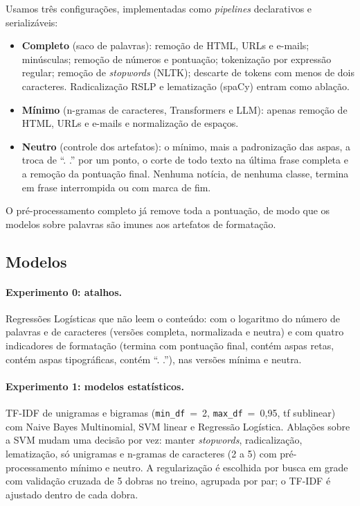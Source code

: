 Usamos três configurações, implementadas como \emph{pipelines} declarativos e serializáveis:
\begin{itemize}
\item \textbf{Completo} (saco de palavras): remoção de HTML, URLs e e-mails; minúsculas; remoção de números e pontuação; tokenização por expressão regular; remoção de \emph{stopwords} (NLTK); descarte de tokens com menos de dois caracteres. Radicalização RSLP \citep{orengo2001} e lematização (spaCy) entram como ablação.
\item \textbf{Mínimo} (n-gramas de caracteres, Transformers e LLM): apenas remoção de HTML, URLs e e-mails e normalização de espaços.
\item \textbf{Neutro} (controle dos artefatos): o mínimo, mais a padronização das aspas, a troca de ``. .'' por um ponto, o corte de todo texto na última frase completa e a remoção da pontuação final. Nenhuma notícia, de nenhuma classe, termina em frase interrompida ou com marca de fim.
\end{itemize}
O pré-processamento completo já remove toda a pontuação, de modo que os modelos sobre palavras são imunes aos artefatos de formatação.

\subsection{Modelos}

\paragraph{Experimento 0: atalhos.} Regressões Logísticas que não leem o conteúdo: com o logaritmo do número de palavras e de caracteres (versões completa, normalizada e neutra) e com quatro indicadores de formatação (termina com pontuação final, contém aspas retas, contém aspas tipográficas, contém ``. .''), nas versões mínima e neutra.

\paragraph{Experimento 1: modelos estatísticos.} TF-IDF de unigramas e bigramas (\texttt{min\_df}~=~2, \texttt{max\_df}~=~0,95, tf sublinear) com Naive Bayes Multinomial, SVM linear e Regressão Logística. Ablações sobre a SVM mudam uma decisão por vez: manter \emph{stopwords}, radicalização, lematização, só unigramas e n-gramas de caracteres (2 a 5) com pré-processamento mínimo e neutro. A regularização é escolhida por busca em grade com validação cruzada de 5 dobras no treino, agrupada por par; o TF-IDF é ajustado dentro de cada dobra.

